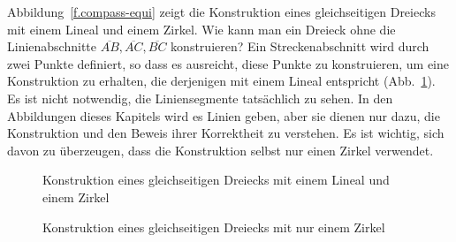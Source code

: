 Abbildung~\ref{f.compass-equi} zeigt die Konstruktion eines gleichseitigen Dreiecks mit einem Lineal und einem Zirkel. Wie kann man ein Dreieck ohne die Linienabschnitte $\overline{AB}, \overline{AC}, \overline{BC}$ konstruieren? Ein Streckenabschnitt wird durch zwei Punkte definiert, so dass es ausreicht, diese Punkte zu konstruieren, um eine Konstruktion zu erhalten, die derjenigen mit einem Lineal entspricht (Abb.~\ref{f.compass-equi-only}). Es ist nicht notwendig, die Liniensegmente tatsächlich zu sehen.
In den Abbildungen dieses Kapitels wird es Linien geben, aber sie dienen nur dazu, die Konstruktion und den Beweis ihrer Korrektheit zu verstehen. Es ist wichtig, sich davon zu überzeugen, dass die Konstruktion selbst nur einen Zirkel verwendet.
\begin{figure}[ht]
\begin{minipage}{.45\textwidth}
\begin{center}
\caption{Konstruktion eines gleichseitigen Dreiecks mit einem Lineal und einem Zirkel}\label{f.compass-equi}
\end{center}
\end{minipage}
\hfill
\begin{minipage}{.45\textwidth}
\begin{center}
\caption{Konstruktion eines gleichseitigen Dreiecks mit nur einem Zirkel}\label{f.compass-equi-only}
\end{center}
\end{minipage}
\end{figure}


